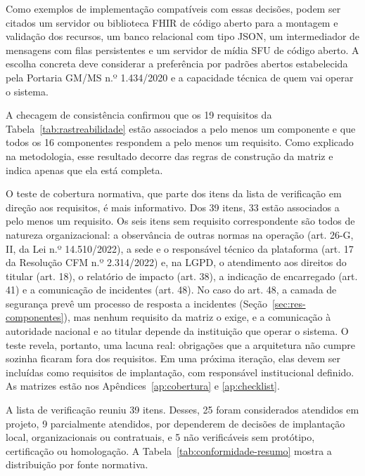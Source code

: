 Como exemplos de implementação compatíveis com essas decisões, podem ser citados um servidor ou biblioteca FHIR de código aberto para a montagem e validação dos recursos, um banco relacional com tipo JSON, um intermediador de mensagens com filas persistentes e um servidor de mídia SFU de código aberto. A escolha concreta deve considerar a preferência por padrões abertos estabelecida pela Portaria GM/MS n.º 1.434/2020 \cite{portaria1434} e a capacidade técnica de quem vai operar o sistema.

\label{sec:res-avaliacao}


A checagem de consistência confirmou que os 19 requisitos da Tabela~\ref{tab:rastreabilidade} estão associados a pelo menos um componente e que todos os 16 componentes respondem a pelo menos um requisito. Como explicado na metodologia, esse resultado decorre das regras de construção da matriz e indica apenas que ela está completa.

O teste de cobertura normativa, que parte dos itens da lista de verificação em direção aos requisitos, é mais informativo. Dos 39 itens, 33 estão associados a pelo menos um requisito. Os seis itens sem requisito correspondente são todos de natureza organizacional: a observância de outras normas na operação (art. 26-G, II, da Lei n.º 14.510/2022), a sede e o responsável técnico da plataforma (art. 17 da Resolução CFM n.º 2.314/2022) e, na LGPD, o atendimento aos direitos do titular (art. 18), o relatório de impacto (art. 38), a indicação de encarregado (art. 41) e a comunicação de incidentes (art. 48). No caso do art. 48, a camada de segurança prevê um processo de resposta a incidentes (Seção~\ref{sec:res-componentes}), mas nenhum requisito da matriz o exige, e a comunicação à autoridade nacional e ao titular depende da instituição que operar o sistema. O teste revela, portanto, uma lacuna real: obrigações que a arquitetura não cumpre sozinha ficaram fora dos requisitos. Em uma próxima iteração, elas devem ser incluídas como requisitos de implantação, com responsável institucional definido. As matrizes estão nos Apêndices~\ref{ap:cobertura} e \ref{ap:checklist}.


A lista de verificação reuniu 39 itens. Desses, 25 foram considerados atendidos em projeto, 9 parcialmente atendidos, por dependerem de decisões de implantação local, organizacionais ou contratuais, e 5 não verificáveis sem protótipo, certificação ou homologação. A Tabela~\ref{tab:conformidade-resumo} mostra a distribuição por fonte normativa.

